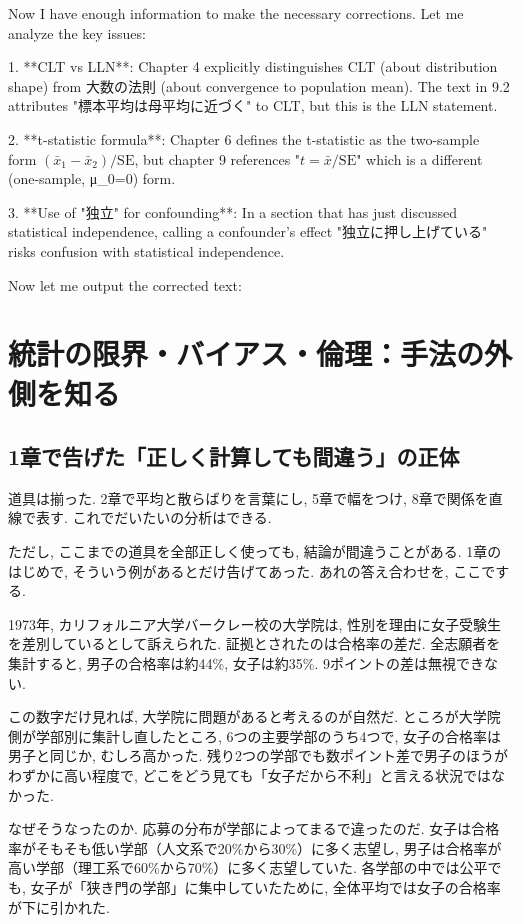 ﻿Now I have enough information to make the necessary corrections. Let me analyze the key issues:

1. **CLT vs LLN**: Chapter 4 explicitly distinguishes CLT (about distribution shape) from 大数の法則 (about convergence to population mean). The text in 9.2 attributes "標本平均は母平均に近づく" to CLT, but this is the LLN statement.

2. **t-statistic formula**: Chapter 6 defines the t-statistic as the two-sample form $(\bar{x}_1 - \bar{x}_2)/\mathrm{SE}$, but chapter 9 references "$t = \bar{x}/\mathrm{SE}$" which is a different (one-sample, μ_0=0) form.

3. **Use of "独立" for confounding**: In a section that has just discussed statistical independence, calling a confounder's effect "独立に押し上げている" risks confusion with statistical independence.

Now let me output the corrected text:

\section{統計の限界・バイアス・倫理：手法の外側を知る}

\subsection{1章で告げた「正しく計算しても間違う」の正体}

道具は揃った.
2章で平均と散らばりを言葉にし, 5章で幅をつけ, 8章で関係を直線で表す. これでだいたいの分析はできる.

ただし, ここまでの道具を全部正しく使っても, 結論が間違うことがある.
1章のはじめで, そういう例があるとだけ告げてあった.
あれの答え合わせを, ここでする.

1973年, カリフォルニア大学バークレー校の大学院は, 性別を理由に女子受験生を差別しているとして訴えられた.
証拠とされたのは合格率の差だ.
全志願者を集計すると, 男子の合格率は約44\%, 女子は約35\%.
9ポイントの差は無視できない.

この数字だけ見れば, 大学院に問題があると考えるのが自然だ.
ところが大学院側が学部別に集計し直したところ, 6つの主要学部のうち4つで, 女子の合格率は男子と同じか, むしろ高かった.
残り2つの学部でも数ポイント差で男子のほうがわずかに高い程度で, どこをどう見ても「女子だから不利」と言える状況ではなかった.

なぜそうなったのか. 応募の分布が学部によってまるで違ったのだ.
女子は合格率がそもそも低い学部（人文系で20\%から30\%）に多く志望し, 男子は合格率が高い学部（理工系で60\%から70\%）に多く志望していた.
各学部の中では公平でも, 女子が「狭き門の学部」に集中していたために, 全体平均では女子の合格率が下に引かれた.

